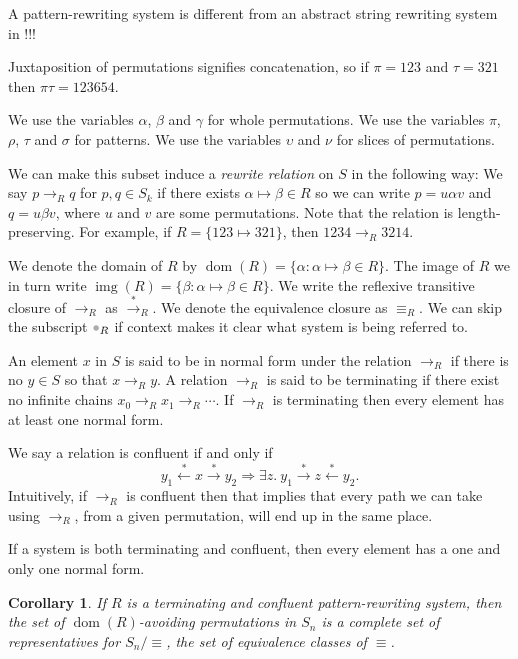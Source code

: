 \documentclass[a4paper, 11pt, english]{article}
\newcommand{\parm}{\mathord{\color{black!33}\bullet}}
\newcommand{\breath}{\vspace{6pt plus 2pt minus 1pt}\noindent}
\newcommand{\patternrule}{ \mapsto \!}
\newtheorem{corollary}[theorem]{Corollary}
\theoremstyle{definition}
\newcommand{\Sym}{S}
\newcommand{\from}{\leftarrow}
\newcommand{\tostar}{\stackrel{*}{\to}}
\newcommand{\fromstar}{\stackrel{*}{\from}}
\DeclareMathOperator{\dom}{dom}
\DeclareMathOperator{\img}{img}
\begin{document}
A pattern-rewriting system is different from an abstract string rewriting system
in !!!

Juxtaposition of permutations signifies concatenation, so if $\pi=123$ and
$\tau=321$ then $\pi\tau=123654$.

We use the variables $\alpha$, $\beta$ and $\gamma$ for whole permutations.
We use the variables $\pi$, $\rho$, $\tau$ and $\sigma$ for patterns.
We use the variables $\upsilon$ and $\nu$ for slices of permutations.

We can make this subset induce a \emph{rewrite relation} on $\Sym$ in the following way: We say
$p \to_R q$ for $p, q \in \Sym_k$ if there exists $\alpha \patternrule \beta \in R$ so
we can write $p = u \alpha v$ and $q = u \beta v$, where
$u$ and $v$ are some permutations.  Note that the relation is
length-preserving. For example, if $R = \{123 \patternrule 321\}$, then $1234 \to_R 3214$. 

\breath We denote the domain of $R$ by $\dom(R) = \{\alpha : \alpha \patternrule
\beta \in R\}$. The image of $R$ we in turn write $\img(R) = \{\beta : \alpha
\patternrule \beta \in R\}$. We write the reflexive transitive closure of
$\to_R$ as $\tostar_R$.  We denote the equivalence closure as $\equiv_R$. We can
skip the subscript $\parm_R$ if context makes it clear what system is being
referred to.

An element $x$ in $\Sym$ is said to be in normal form under the relation $\to_R$
if there is no $y \in \Sym$ so that $x \to_R y$. A relation $\to_R$ is said to be
terminating if there exist no infinite chains $x_0 \to_R x_1 \to_R \cdots$. If
$\to_R$ is terminating then every element has at least one normal form. 

We say a relation is confluent if and only if
$$
    y_1 \fromstar x \tostar y_2 \Longrightarrow 
    \exists z. \  y_1 \tostar z \fromstar y_2.
$$
Intuitively, if $\to_R$ is confluent then that implies that every path we can
take using $\to_R$, from a given permutation, will end up in the same place. 

If a system is both terminating and confluent, then every element has a one and
only one normal form.

\begin{corollary}
    If $R$ is a terminating and confluent pattern-rewriting system, then the set
    of $\dom(R)$-avoiding permutations in $S_n$ is a complete set of
    representatives for $S_n / \equiv$, the set of equivalence classes of
    $\equiv$.
\end{corollary}
\end{document}
